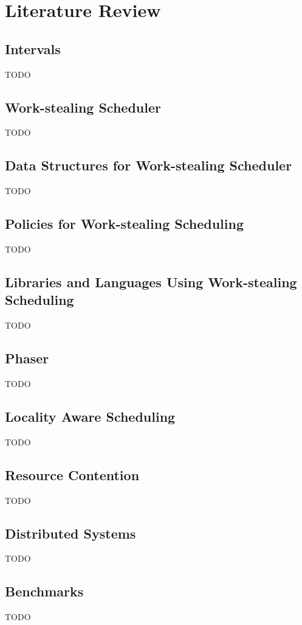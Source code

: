 
\chapter{Literature Review}
\label{cha:literature-review}

\section{Intervals}
\label{sec:lr-intervals}

TODO


\section{Work-stealing Scheduler}
\label{sec:lr-work-stealing-scheduler}

TODO


\section{Data Structures for Work-stealing Scheduler}
\label{sec:lr-data-structures-for-work-stealing-scheduler}

TODO


\section{Policies for Work-stealing Scheduling}
\label{sec:lr-policies-for-work-stealing-scheduling}

TODO


\section{Libraries and Languages Using Work-stealing Scheduling}
\label{sec:lr-libaries-and-languages-using-work-stealing-scheduling}

TODO


\section{Phaser}
\label{sec:lr-phaser}

TODO


\section{Locality Aware Scheduling}
\label{sec:lr-locality-aware-scheduling}

TODO


\section{Resource Contention}
\label{sec:lr-resource-contention}

TODO


\section{Distributed Systems}
\label{sec:lr-distributed-systems}

TODO


\section{Benchmarks}
\label{sec:lr-benchmarks}

TODO